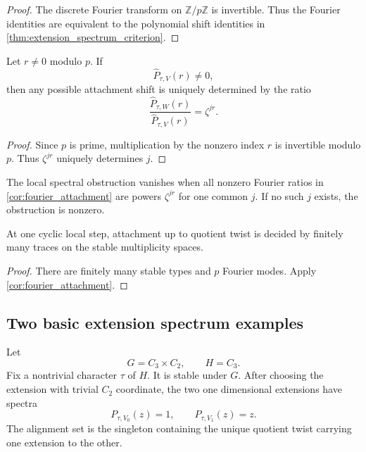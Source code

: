 \documentclass{aomart}
\theoremstyle{definition}
\theoremstyle{remark}
\newcommand{\ZZ}{\mathbb Z}
\begin{document}
\begin{proof}
The discrete Fourier transform on \(\ZZ/p\ZZ\) is invertible. Thus the Fourier identities are equivalent to the polynomial shift identities in \cref{thm:extension_spectrum_criterion}.
\end{proof}

\begin{corollary}\label{cor:one_fourier_mode}
Let \(r\neq0\) modulo \(p\). If
\[
 \widehat P_{\tau,V}(r)\neq0,
\]
then any possible attachment shift is uniquely determined by the ratio
\[
 \boxed{
 \frac{\widehat P_{\tau,W}(r)}{\widehat P_{\tau,V}(r)}
 =
 \zeta^{jr}.
 }
\]
\end{corollary}

\begin{proof}
Since \(p\) is prime, multiplication by the nonzero index \(r\) is invertible modulo \(p\). Thus \(\zeta^{jr}\) uniquely determines \(j\).
\end{proof}

\begin{definition}\label{def:local_spectral_obstruction}
The local spectral obstruction vanishes when all nonzero Fourier ratios in \cref{cor:fourier_attachment} are powers \(\zeta^{jr}\) for one common \(j\). If no such \(j\) exists, the obstruction is nonzero.
\end{definition}

\begin{corollary}\label{cor:finite_local_decision}
At one cyclic local step, attachment up to quotient twist is decided by finitely many traces on the stable multiplicity spaces.
\end{corollary}

\begin{proof}
There are finitely many stable types and \(p\) Fourier modes. Apply \cref{cor:fourier_attachment}.
\end{proof}

\subsection{Two basic extension spectrum examples}

\begin{example}\label{ex:stable_cyclic_type}
Let
\[
 G=C_3\times C_2,
 \qquad
 H=C_3.
\]
Fix a nontrivial character \(\tau\) of \(H\). It is stable under \(G\). After choosing the extension with trivial \(C_2\) coordinate, the two one dimensional extensions have spectra
\[
 P_{\tau,V_0}(z)=1,
 \qquad
 P_{\tau,V_1}(z)=z.
\]
The alignment set is the singleton containing the unique quotient twist carrying one extension to the other.
\end{example}
\end{document}
